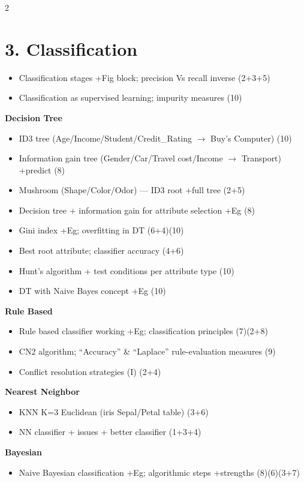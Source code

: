 \documentclass[10pt]{article}
\begin{document}
\begin{multicols}{2}
\section*{3. Classification}
\begin{itemize}
  \item Classification stages +Fig block; precision Vs recall inverse \hfill (2+3+5)
  \item Classification as supervised learning; impurity measures \hfill (10)
\end{itemize}
\textbf{Decision Tree}
\begin{itemize}
  \item ID3 tree (Age/Income/Student/Credit\_Rating $\to$ Buy's Computer) \hfill (10)
  \item Information gain tree (Gender/Car/Travel cost/Income $\to$ Transport) +predict \hfill (8)
  \item Mushroom (Shape/Color/Odor) --- ID3 root +full tree \hfill (2+5)
  \item Decision tree + information gain for attribute selection +Eg \hfill (8)
  \item Gini index +Eg; overfitting in DT \hfill (6+4)(10)
  \item Best root attribute; classifier accuracy \hfill (4+6)
  \item Hunt's algorithm + test conditions per attribute type \hfill (10)
  \item DT with Naive Bayes concept +Eg \hfill (10)
\end{itemize}
\textbf{Rule Based}
\begin{itemize}
  \item Rule based classifier working +Eg; classification principles \hfill (7)(2+8)
  \item CN2 algorithm; ``Accuracy'' \& ``Laplace'' rule-evaluation measures \hfill (9)
  \item Conflict resolution strategies (I) \hfill (2+4)
\end{itemize}
\textbf{Nearest Neighbor}
\begin{itemize}
  \item KNN K=3 Euclidean (iris Sepal/Petal table) \hfill (3+6)
  \item NN classifier + issues + better classifier \hfill (1+3+4)
\end{itemize}
\textbf{Bayesian}
\begin{itemize}
  \item Naive Bayesian classification +Eg; algorithmic steps +strengths \hfill (8)(6)(3+7)

\end{itemize}
\end{multicols}
\end{document}
